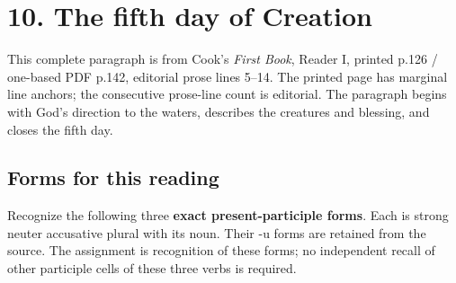 \section*{10. The fifth day of Creation}

This complete paragraph is from Cook’s \emph{First Book}, Reader I, printed p.126 /\allowbreak{} one-based PDF p.142, editorial prose lines 5–14. The printed page has marginal line anchors; the consecutive prose-line count is editorial. The paragraph begins with God’s direction to the waters, describes the creatures and blessing, and closes the fifth day.

\par\begin{minipage}{\linewidth}\raggedright
{}
\end{minipage}\par

\subsection*{Forms for this reading}

Recognize the following three \textbf{exact present-participle forms}. Each is strong neuter accusative plural with its noun. Their -u forms are retained from the source. The assignment is recognition of these forms; no independent recall of other participle cells of these three verbs is required.

